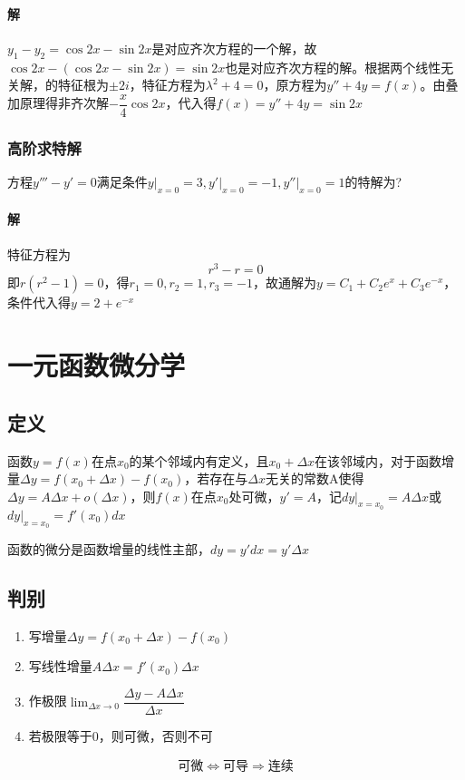 \paragraph{解}
\(y_1 - y_2 = \cos2x - \sin2x\)是对应齐次方程的一个解，故\(\cos2x - (\cos2x - \sin2x) = \sin2x\)也是对应齐次方程的解。根据两个线性无关解，的特征根为\(\pm2i\)，特征方程为\(\lambda^2 + 4 = 0\)，原方程为\(y'' + 4y = f(x)\)。由叠加原理得非齐次解\(-\dfrac{x}{4}\cos2x\)，代入得\(f(x) = y'' + 4y = \sin2x\)


\subsubsection{高阶求特解}
方程\(y''' - y' = 0\)满足条件\(y\bigg|_{x = 0} = 3, y'\bigg|_{x = 0} = -1, y''\bigg|_{x = 0} = 1\)的特解为?
\paragraph{解}
特征方程为\[r^3 - r = 0\]即\(r(r^2 - 1) = 0\)，得\(r_1 = 0, r_2 = 1, r_3 = -1\)，故通解为\(y = C_1 + C_2e^x + C_3e^{-x}\)，条件代入得\(y = 2 + e^{-x}\)


\section{一元函数微分学}

\subsection{定义}

函数\(y = f(x)\)在点\(x_0\)的某个邻域内有定义，且\(x_0 + \Delta x\)在该邻域内，对于函数增量\(\Delta y = f(x_0 + \Delta x) - f(x_0)\)，若存在与\(\Delta x\)无关的常数A使得\(\Delta y = A\Delta x + o(\Delta x)\)，则\(f(x)\)在点\(x_0\)处可微，\(y' = A\)，记\(dy|_{x = x_0} = A\Delta x\)或\(dy|_{x = x_0} = f'(x_0)dx\)

函数的微分是函数增量的线性主部，\(dy = y'dx = y'\Delta x\)


\subsection{判别}
\begin{enumerate}
    \item 写增量\(\Delta y = f(x_0 + \Delta x) - f(x_0)\)
    \item 写线性增量\(A\Delta x = f'(x_0)\Delta x\)
    \item 作极限\(\displaystyle \lim_{\Delta x \to 0}\dfrac{\Delta y - A\Delta x}{\Delta x}\)
    \item 若极限等于0，则可微，否则不可
\end{enumerate}
\[\text{可微} \Leftrightarrow \text{可导} \Rightarrow \text{连续}\]


